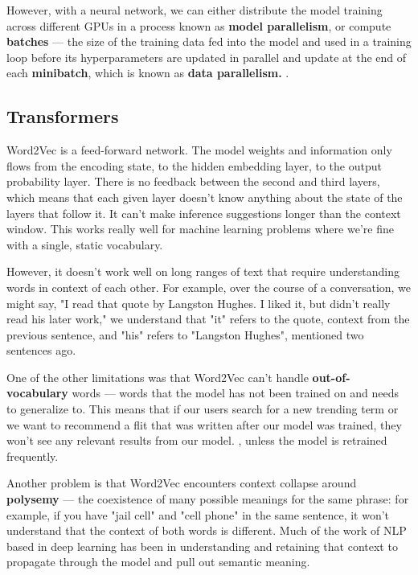 \documentclass[11pt, table]{diazessay} %
\begin{document}
\begin{sloppypar}
However, with a neural network, we can either distribute the model training across different GPUs in a process known as \textbf{model parallelism}, or compute \textbf{batches} --- the size of the training data fed into the model and used in a training loop before its hyperparameters are updated in parallel and update at the end of each \textbf{minibatch}, which is known as \textbf{data parallelism.} \citep{shallue2018measuring}.


\subsection{Transformers}

Word2Vec is a feed-forward network. The model weights and information only flows from the encoding state, to the hidden embedding layer, to the output probability layer. There is no feedback between the second and third layers, which means that each given layer doesn't know anything about the state of the layers that follow it. It can't make inference suggestions longer than the context window. This works really well for machine learning problems where we're fine with a single, static vocabulary.

However, it doesn't work well on long ranges of text that require understanding words in context of each other. For example, over the course of a conversation, we might say, "I read that quote by Langston Hughes. I liked it, but didn't really read his later work," we understand that "it" refers to the quote, context from the previous sentence, and "his" refers to "Langston Hughes", mentioned two sentences ago.

One of the other limitations was that Word2Vec can't handle \textbf{out-of-vocabulary} words --- words that the model has not been trained on and needs to generalize to. This means that if our users search for a new trending term or we want to recommend a flit that was written after our model was trained, they won't see any relevant results from our model. \citep{di2021considerations}, unless the model is retrained frequently.

Another problem is that Word2Vec encounters context collapse around \textbf{polysemy} --- the coexistence of many possible meanings for the same phrase: for example, if you have "jail cell" and "cell phone" in the same sentence, it won't understand that the context of both words is different. Much of the work of NLP based in deep learning has been in understanding and retaining that context to propagate through the model and pull out semantic meaning.   


\end{sloppypar}
\end{document}
